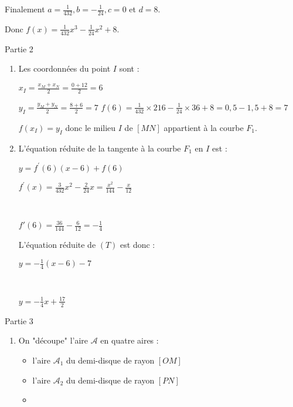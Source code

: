 \begin{corrige}
\begin{enumerate}
     Finalement $ a=\frac{1}{432},  b=-\frac{1}{24}, c=0  $ et $d=8$.
     \par
     Donc $f(x)=\frac{1}{432}x^3-\frac{1}{24}x^2+8$.
\end{enumerate}
\begin{h3}Partie 2\end{h3}
\begin{enumerate}
     \item
     Les coordonnées du point $I$ sont :
     \par
     $x_I=\frac{x_M+x_N}{2}=\frac{0+12}{2}=6$
     \par
     $y_I=\frac{y_M+y_N}{2}=\frac{8+6}{2}=7$
$f(6)=\frac{1}{432} \times 216-\frac{1}{24} \times 36+8$$=0,5-1,5+8=7$
\par
$f(x_I)=y_I$ donc le milieu $I$ de $[MN]$ appartient à la courbe $F_1$.
\item
L'équation réduite de la tangente à la courbe $F_1$ en $I$ est :
\par
$y=f ^{\prime}(6)(x-6)+f(6)$
\par
$f ^{\prime}(x)=\frac{3}{432}x^2-\frac{2}{24}x$$=\frac{x^2}{144}-\frac{x}{12}$
\par
~
\par
$f'(6)=\frac{36}{144}-\frac{6}{12}=-\frac{1}{4}$
\par
L'équation réduite de $(T)$ est donc :
\par
$y=-\frac{1}{4}(x-6)-7$
\par
~
\par
$y=-\frac{1}{4}x+\frac{17}{2}$
\begin{center}
\end{center}   
\end{enumerate}
\begin{h3}Partie 3\end{h3}
\begin{enumerate}
     \item
     On "découpe" l'aire $\mathscr A$ en quatre aires :
     \begin{itemize}
          \item
          l'aire $\mathscr A_1$ du demi-disque de rayon $[OM]$
          \item
          l'aire $\mathscr A_2$ du demi-disque de rayon $[PN]$
          \item

\end{itemize}
\end{enumerate}
\end{corrige}
